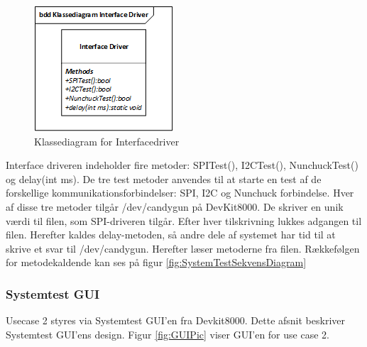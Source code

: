 \begin{figure}[H]
	\centering
	\includegraphics[width=\textwidth]{Afsnit/DesignOgImplementering/images/InterfacedriverKlassediagram}
	\caption{Klassediagram for Interfacedriver}
	\label{fig:idriverclass}
\end{figure}

Interface driveren indeholder fire metoder: SPITest(), I2CTest(), NunchuckTest() og delay(int ms). De tre test metoder anvendes til at starte en test af de forskellige kommunikationsforbindelser: SPI, I2C og Nunchuck forbindelse.
Hver af disse tre metoder tilgår /dev/candygun på DevKit8000.
De skriver en unik værdi til filen, som SPI-driveren tilgår.
Efter hver tilskrivning lukkes adgangen til filen. Herefter kaldes delay-metoden, så andre dele af systemet har tid til at skrive et svar til /dev/candygun. Herefter læser metoderne fra filen. Rækkefølgen for metodekaldende kan ses på figur \ref{fig:SystemTestSekvensDiagram}

\subsubsection{Systemtest GUI}
\label{afsnit:sysGUI}
Usecase 2 styres via Systemtest GUI'en fra Devkit8000.
Dette afsnit beskriver Systemtest GUI'ens design. Figur \ref{fig:GUIPic} viser GUI'en for use case 2.

